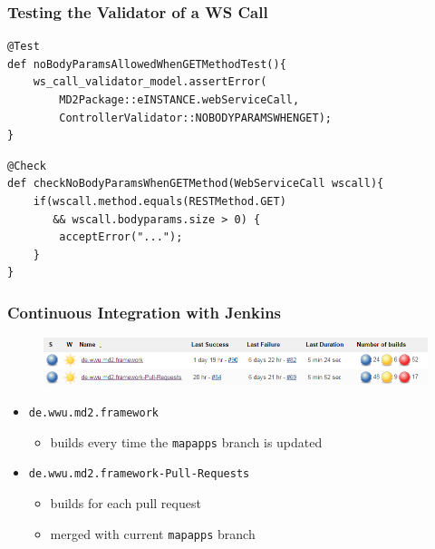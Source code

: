 \begin{frame}[fragile]
\frametitle{Testing the Validator of a WS Call}

\begin{lstlisting}
@Test
def noBodyParamsAllowedWhenGETMethodTest(){
    ws_call_validator_model.assertError(
        MD2Package::eINSTANCE.webServiceCall,
        ControllerValidator::NOBODYPARAMSWHENGET);
}
\end{lstlisting}

\vfill

\begin{lstlisting}
@Check
def checkNoBodyParamsWhenGETMethod(WebServiceCall wscall){
    if(wscall.method.equals(RESTMethod.GET) 
       && wscall.bodyparams.size > 0) {
        acceptError("...");
    }
}
\end{lstlisting}

\end{frame}


\begin{frame}
    \frametitle{Continuous Integration with Jenkins}
    
    \begin{figure}
    	\includegraphics[width= 0.9\linewidth]{images/jenkins-jobs.png}
    \end{figure}
    
    \vspace{-1ex}
    
    \begin{itemize}
       \item \texttt{de.wwu.md2.framework}
       \begin{itemize}
           \item builds every time the \texttt{mapapps} branch is updated
       \end{itemize}
       \item \texttt{de.wwu.md2.framework-Pull-Requests} 
       \begin{itemize}
           \item builds for each pull request
           \item merged with current \texttt{mapapps} branch
       \end{itemize}
    \end{itemize}
\end{frame}

